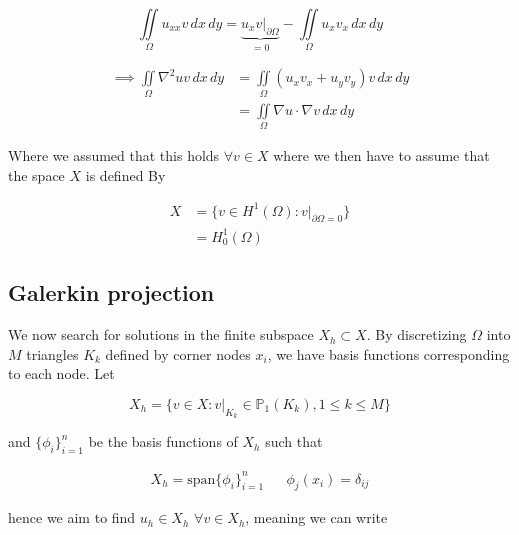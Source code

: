 \documentclass[5p,a4paper,english]{elsarticle}%
\begin{document}
\begin{equation*}
    \iint\limits_{\Omega} u_{xx}v \, dx \, dy 
    = \underbrace{u_xv |_{\partial \Omega}}_{=0} - \iint\limits_{\Omega} u_xv_x \, dx \, dy 
\end{equation*}
    

\begin{equation*}
\begin{aligned}
    \implies
    \iint\limits_{\Omega} \nabla^2uv \, dx \, dy &= \iint\limits_{\Omega} (u_xv_x + u_yv_y)v \, dx \, dy \\
    &= \iint\limits_{\Omega} \nabla u \cdot \nabla v \, dx \, dy 
\end{aligned}
\end{equation*}

Where we assumed that this holds  $\forall v \in X$ where we then have to assume that the space $X$ is defined By

\begin{equation*}
    \begin{aligned}
        X &= \{v \in H^1(\Omega) : v|_{\partial \Omega = 0} \} \\
         &= H^1_0(\Omega)
    \end{aligned}
\end{equation*}

\subsection{Galerkin projection}

We now search for solutions in the finite subspace $X_h \subset X$. 
By discretizing $\Omega$ into $M$ triangles $K_k$ defined by corner nodes $x_i$, we have basis functions corresponding to each node.
Let 

\begin{equation*}
X_h = \{ v \in X : v|_{K_k} \in \mathbb{P}_1 (K_k),1\leq k\leq M \}
\end{equation*}

and $\{\phi_i\}_{i=1}^n$ be the basis functions of $X_h$ such that

\begin{equation*}
    \begin{aligned}
X_h = \text{span} \{\phi_i\}_{i=1}^n & & \phi_j(x_i) = \delta_{ij}
    \end{aligned}
\end{equation*}

hence we aim to find $u_h \in X_h$ $\forall v \in X_h$, meaning we can write
\end{document}
